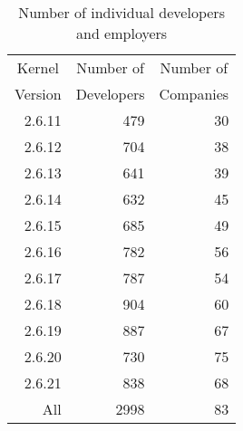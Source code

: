 \documentclass[final]{ols}
\begin{document}
\begin{table}%
\begin{center}
\begin{tabular}{|r|r|r|}
\hline
\multicolumn{1}{|c|}{Kernel}  & \multicolumn{1}{|c|}{Number of}  & \multicolumn{1}{|c|}{Number of} \\
\multicolumn{1}{|c|}{Version} & \multicolumn{1}{|c|}{Developers} & \multicolumn{1}{|c|}{Companies}\\
\hline
\hline
\rule[-0.1ex]{0pt}{2.5ex}2.6.11	& 479\hspace{2ex}	& 30\hspace{3ex}	\\
2.6.12	& 704\hspace{2ex}	& 38\hspace{3ex}	\\
2.6.13	& 641\hspace{2ex}	& 39\hspace{3ex}	\\
2.6.14	& 632\hspace{2ex}	& 45\hspace{3ex}	\\
2.6.15	& 685\hspace{2ex}	& 49\hspace{3ex}	\\
2.6.16	& 782\hspace{2ex}	& 56\hspace{3ex}	\\
2.6.17	& 787\hspace{2ex}	& 54\hspace{3ex}	\\
2.6.18	& 904\hspace{2ex}	& 60\hspace{3ex}	\\
2.6.19	& 887\hspace{2ex}	& 67\hspace{3ex}	\\
2.6.20	& 730\hspace{2ex}	& 75\hspace{3ex}	\\
2.6.21	& 838\hspace{2ex}	& 68\hspace{3ex}	\\
\hline
\rule[-0.1ex]{0pt}{2.5ex}All	& 2998\hspace{2ex}	& 83\hspace{3ex}	\\
\hline
\end{tabular}
\caption{Number of individual developers and employers}
\label{gkh-num-developers}
\end{center}
\end{table}
\end{document}
